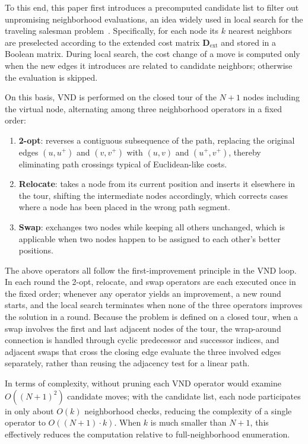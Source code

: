To this end, this paper first introduces a precomputed candidate list to filter out unpromising neighborhood evaluations, an idea widely used in local search for the traveling salesman problem~\textcolor{blue}{\cite{ref26}}. Specifically, for each node its $k$ nearest neighbors are preselected according to the extended cost matrix $\mathbf{D}_{\mathrm{ext}}$ and stored in a Boolean matrix. During local search, the cost change of a move is computed only when the new edges it introduces are related to candidate neighbors; otherwise the evaluation is skipped.

On this basis, VND is performed on the closed tour of the $N+1$ nodes including the virtual node, alternating among three neighborhood operators in a fixed order:
\begin{enumerate}
\item \textbf{2-opt}: reverses a contiguous subsequence of the path, replacing the original edges $(u, u^{+})$ and $(v, v^{+})$ with $(u, v)$ and $(u^{+}, v^{+})$, thereby eliminating path crossings typical of Euclidean-like costs.
\item \textbf{Relocate}: takes a node from its current position and inserts it elsewhere in the tour, shifting the intermediate nodes accordingly, which corrects cases where a node has been placed in the wrong path segment.
\item \textbf{Swap}: exchanges two nodes while keeping all others unchanged, which is applicable when two nodes happen to be assigned to each other's better positions.
\end{enumerate}
The above operators all follow the first-improvement principle in the VND loop. In each round the 2-opt, relocate, and swap operators are each executed once in the fixed order; whenever any operator yields an improvement, a new round starts, and the local search terminates when none of the three operators improves the solution in a round. Because the problem is defined on a closed tour, when a swap involves the first and last adjacent nodes of the tour, the wrap-around connection is handled through cyclic predecessor and successor indices, and adjacent swaps that cross the closing edge evaluate the three involved edges separately, rather than reusing the adjacency test for a linear path.

In terms of complexity, without pruning each VND operator would examine $O((N+1)^2)$ candidate moves; with the candidate list, each node participates in only about $O(k)$ neighborhood checks, reducing the complexity of a single operator to $O((N+1)\cdot k)$. When $k$ is much smaller than $N+1$, this effectively reduces the computation relative to full-neighborhood enumeration.


